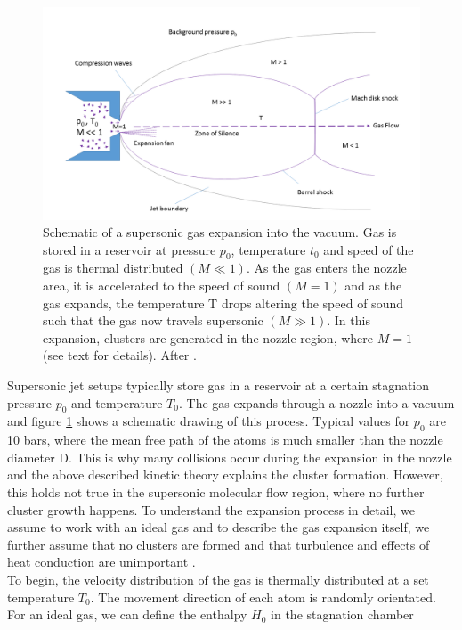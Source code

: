 \begin{figure}
	\centering
		\includegraphics[width=1.00\textwidth]{images/freeJetExpansion.png}
	\caption[Schematic of a supersonic gas expansion into a vacuum.]{Schematic of a supersonic gas expansion into the vacuum. Gas is stored in a reservoir at pressure $p_{0}$, temperature $t_{0}$ and speed of the gas is thermal distributed $\left(M\ll 1\right)$. As the gas enters the nozzle area, it is accelerated to the speed of sound $\left(M=1\right)$ and as the gas expands, the temperature T drops altering the speed of sound such that the gas now travels supersonic $\left(M\gg 1\right)$. In this expansion, clusters are generated in the nozzle region, where $M=1$ (see text for details). After \citep{Miller-1988-Oxford}.}
	\label{fig:freeJetExpansion}
\end{figure}
Supersonic jet setups typically store gas in a reservoir at a certain stagnation pressure $p_{0}$ and temperature $T_{0}$. The gas expands through a nozzle into a vacuum and figure \ref{fig:freeJetExpansion} shows a schematic drawing of this process. Typical values for $p_{0}$ are 10 bars, where the mean free path of the atoms is much smaller than the nozzle diameter D. This is why many collisions occur during the expansion in the nozzle and the above described kinetic theory explains the cluster formation. However, this holds not true in the supersonic molecular flow region, where no further cluster growth happens. To understand the expansion process in detail, we assume to work with an ideal gas and to describe the gas expansion itself, we further assume that no clusters are formed and that turbulence and effects of heat conduction are unimportant \cite{Yamada-2001-SciDir,Haberland-1994-Springer}.\\
To begin, the velocity distribution of the gas is thermally distributed at a set temperature $T_{0}$. The movement direction of each atom is randomly orientated. For an ideal gas, we can define the enthalpy $H_{0}$ in the stagnation chamber
